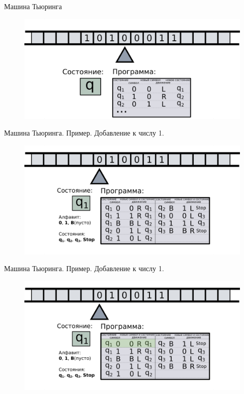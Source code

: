 \documentclass[newPxFont]{beamer}
\begin{document}
\begin{frame}{Машина Тьюринга}
	\begin{figure}
		\centerline{\includegraphics[width=1.5\linewidth]{images/tm_4.png}}
	\end{figure}
\end{frame}




\begin{frame}{Машина Тьюринга. Пример. Добавление к числу 1.}
	\begin{figure}
		\centerline{\includegraphics[width=1.5\linewidth]{images/tm_ex_1.png}}
	\end{figure}
\end{frame}

\begin{frame}{Машина Тьюринга. Пример. Добавление к числу 1.}
	\begin{figure}
		\centerline{\includegraphics[width=1.5\linewidth]{images/tm_ex_2.png}}
	\end{figure}
\end{frame}
\end{document}
